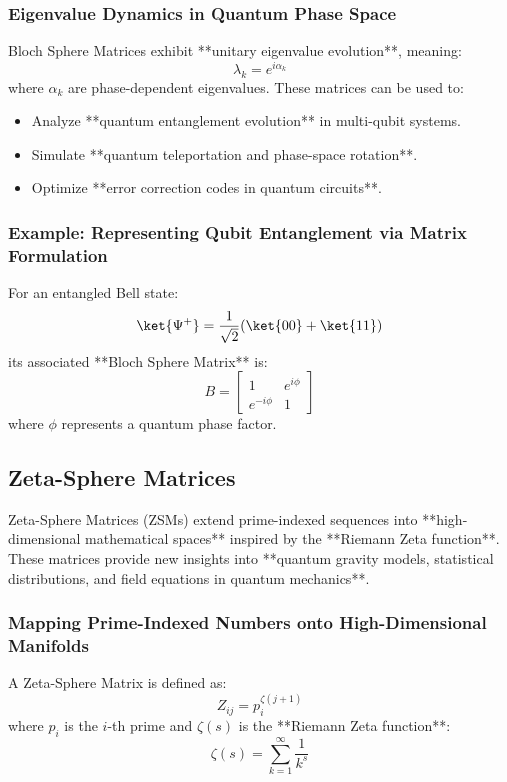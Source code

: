 \documentclass{article}
\theoremstyle{plain}
\begin{document}
\subsubsection{Eigenvalue Dynamics in Quantum Phase Space}
Bloch Sphere Matrices exhibit **unitary eigenvalue evolution**, meaning:
\begin{equation}
    \lambda_k = e^{i\alpha_k}
\end{equation}
where \( \alpha_k \) are phase-dependent eigenvalues. These matrices can be used to:
\begin{itemize}
    \item Analyze **quantum entanglement evolution** in multi-qubit systems.
    \item Simulate **quantum teleportation and phase-space rotation**.
    \item Optimize **error correction codes in quantum circuits**.
\end{itemize}

\subsubsection{Example: Representing Qubit Entanglement via Matrix Formulation}
For an entangled Bell state:
\begin{equation}
    \ket{\Psi^+} = \frac{1}{\sqrt{2}} (\ket{00} + \ket{11})
\end{equation}
its associated **Bloch Sphere Matrix** is:
\begin{equation}
    B =
    \begin{bmatrix}
    1 & e^{i\phi} \\
    e^{-i\phi} & 1
    \end{bmatrix}
\end{equation}
where \( \phi \) represents a quantum phase factor.

\subsection{Zeta-Sphere Matrices}

Zeta-Sphere Matrices (ZSMs) extend prime-indexed sequences into **high-dimensional mathematical spaces** inspired by the **Riemann Zeta function**. These matrices provide new insights into **quantum gravity models, statistical distributions, and field equations in quantum mechanics**.

\subsubsection{Mapping Prime-Indexed Numbers onto High-Dimensional Manifolds}
A Zeta-Sphere Matrix is defined as:
\begin{equation}
    Z_{ij} = p_i^{\zeta(j+1)}
\end{equation}
where \( p_i \) is the \( i \)-th prime and \( \zeta(s) \) is the **Riemann Zeta function**:
\begin{equation}
    \zeta(s) = \sum_{k=1}^{\infty} \frac{1}{k^s}
\end{equation}
\end{document}
